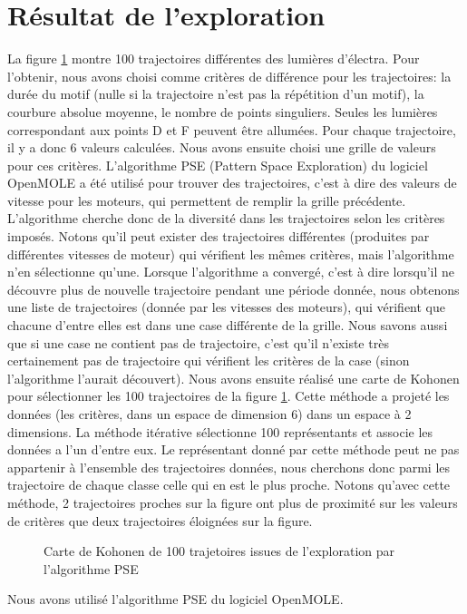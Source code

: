 \documentclass[11pt,a4paper]{article}
\begin{document}
\section{Résultat de l'exploration}
La figure \ref{carte_Kohonen} montre 100 trajectoires différentes des lumières d'électra. Pour l'obtenir, nous avons choisi comme critères de différence pour les trajectoires: la durée du motif (nulle si la trajectoire n'est pas la répétition d'un motif), la courbure absolue moyenne, le nombre de points singuliers. Seules les lumières correspondant aux points D et F peuvent être allumées. Pour chaque trajectoire, il y a donc 6 valeurs calculées. Nous avons ensuite choisi une grille de valeurs pour ces critères. L'algorithme PSE (Pattern Space Exploration) du logiciel OpenMOLE a été utilisé pour trouver des trajectoires, c'est à dire des valeurs de vitesse pour les moteurs, qui permettent de remplir la grille précédente. L'algorithme cherche donc de la diversité dans les trajectoires selon les critères imposés. Notons qu'il peut exister des trajectoires différentes (produites par différentes vitesses de moteur) qui vérifient les mêmes critères, mais l'algorithme n'en sélectionne qu'une. Lorsque l'algorithme a convergé, c'est à dire lorsqu'il ne découvre plus de nouvelle trajectoire pendant une période donnée, nous obtenons une liste de trajectoires (donnée par les vitesses des moteurs), qui vérifient que chacune d'entre elles est dans une case différente de la grille. Nous savons aussi que si une case ne contient pas de trajectoire, c'est qu'il n'existe très certainement pas de trajectoire qui vérifient les critères de la case (sinon l'algorithme l'aurait découvert). Nous avons ensuite réalisé une carte de Kohonen pour sélectionner les 100 trajectoires de la figure \ref{carte_Kohonen}. Cette méthode a projeté les données (les critères, dans un espace de dimension 6) dans un espace à 2 dimensions. La méthode itérative sélectionne 100 représentants et associe les données a l'un d'entre eux. Le représentant donné par cette méthode peut ne pas appartenir à l'ensemble des trajectoires données, nous cherchons donc parmi les trajectoire de chaque classe celle qui en est le plus proche. Notons qu'avec cette méthode, 2 trajectoires proches sur la figure ont plus de proximité sur les valeurs de critères que deux trajectoires éloignées sur la figure.




\begin{figure}[H] 
\center{\texttt{[image: tableauPlot\_kohonen\_PSE\_9\_1\_twoPoint\_ordre\_nbMot=6\_Taille\_grille=100\_colorTranspa\_vitesse\_low]}}
\caption{Carte de Kohonen de 100 trajetoires issues de l'exploration par l'algorithme PSE}
\label{carte_Kohonen}
\end{figure}



Nous avons utilisé l'algorithme PSE du logiciel OpenMOLE. 







 
\end{document}
